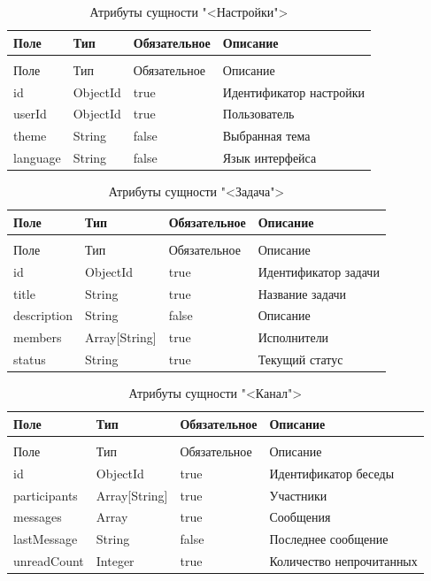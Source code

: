 \begin{xltabular}{\textwidth}{|l|l|p{3.2cm}|X|}
  \caption{Атрибуты сущности "<Настройки">\label{settings:table}}\\ \hline
  Поле & Тип & Обязательное & Описание \\ \hline
  \endfirsthead
  \\ \hline
  Поле & Тип & Обязательное & Описание \\ \hline
  \endhead
  id & ObjectId & true & Идентификатор настройки \\ \hline
  userId & ObjectId & true & Пользователь \\ \hline
  theme & String & false & Выбранная тема \\ \hline
  language & String & false & Язык интерфейса \\ \hline
\end{xltabular}

\begin{xltabular}{\textwidth}{|l|l|p{3.2cm}|X|}
  \caption{Атрибуты сущности "<Задача">\label{projects:table}}\\ \hline
  Поле & Тип & Обязательное & Описание \\ \hline
  \endfirsthead
  \\ \hline
  Поле & Тип & Обязательное & Описание \\ \hline
  \endhead
  id & ObjectId & true & Идентификатор задачи \\ \hline
  title & String & true & Название задачи \\ \hline
  description & String & false & Описание \\ \hline
  members & Array[String] & true & Исполнители \\ \hline
  status & String & true & Текущий статус \\ \hline
\end{xltabular}

\begin{xltabular}{\textwidth}{|l|l|p{3.2cm}|X|}
  \caption{Атрибуты сущности "<Канал">\label{talks:table}}\\ \hline
  Поле & Тип & Обязательное & Описание \\ \hline
  \endfirsthead
  \\ \hline
  Поле & Тип & Обязательное & Описание \\ \hline
  \endhead
  id & ObjectId & true & Идентификатор беседы \\ \hline
  participants & Array[String] & true & Участники \\ \hline
  messages & Array & true & Сообщения \\ \hline
  lastMessage & String & false & Последнее сообщение \\ \hline
  unreadCount & Integer & true & Количество непрочитанных \\ \hline
\end{xltabular}

